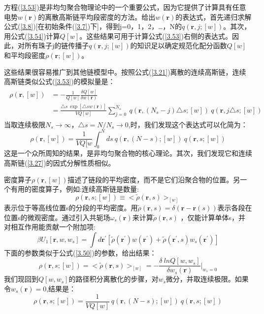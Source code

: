 方程(\ref{3.53})是非均匀聚合物理论中的一个重要公式，因为它提供了计算具有任意电势$w(\mathbf{r})$的离散高斯链平均段密度的方法。给出$w(\mathbf{r})$的表达式，首先递归求解公式(\ref{3.8})[在初始条件(\ref{3.7})下]，得到j=0，1，2，…，N的$q(\mathbf{r},j;[w])$。其次，用公式(\ref{3.54})计算$Q[w]$。这些结果可用于计算公式(\ref{3.53})右侧的表达式。因此，对所有珠子j的链传播子$q(\mathbf{r},j;[w])$的知识足以确定规范化配分函数$Q[w]$和平均段密度$\rho(\mathbf{r};[w])$。

这些结果很容易推广到其他链模型中。按照公式(\ref{3.21})离散的连续高斯链，连续高斯链类似公式(\ref{3.53})的模拟量是：
\begin{align}\label{3.54}
\begin{split}
\rho(\mathbf{r},[w])&=-\frac{1}{Q[w]}\frac{\delta Q[w]}{\delta w(\mathbf{r})}\\ &=\frac{\triangle s ~\exp[\triangle sw(\mathbf{r})]}{VQ[w]}\sum_{j=0}^{N_s}~q(\mathbf{r},(N_s-j)\triangle s;[w])~q(\mathbf{r},j\triangle s;[w])
\end{split}
\end{align}
当取连续极限$N_s\to \infty$，$\triangle s=N/N_s\to 0$,时，我们发现这个表达式可以化简为：
\begin{equation}\label{3.55}
\rho(\mathbf{r},[w])=\frac{1}{VQ[w}\int_{0}^{N}ds~q(\mathbf{r},(N-s);[w])~q(\mathbf{r},s;[w])
\end{equation}
这是一个众所周知的结果，是非均匀聚合物的核心理论。其次，我们发现它和连续高斯链(\ref{3.27})的因式分解性质相似。

密度算子$\rho(\mathbf{r},[w])$描述了链段的平均密度，而不是它们沿聚合物的位置。另一个有用的密度算子，例如:连续高斯链是数量:
\begin{equation}\label{3.56}
\rho(\mathbf{r},s;[w])\equiv <\tilde{\rho}(\mathbf{r},s)>_{[w]}
\end{equation}
表示位于等高线位置s的分段的平均密度。用$\tilde{\rho}(\mathbf{r},s)=\delta(\mathbf{r}-\mathbf{r}(s))$表示各段在位置s的微观密度。通过引入共轭场$\omega_s(\mathbf{r})$来计算$\tilde{\rho}(\mathbf{r},s)$
，仅能计算单体s，并对相互作用能贡献一个附加项:
\begin{equation}\label{3.57}
\beta U_1[\mathbf{r},w ,w_s]=\int d\mathbf{r}^{'}[\tilde{\rho}(\mathbf{r}^{'})w (\mathbf{r}^{'})+\tilde{\rho}(\mathbf{r}^{'},s)w_s(\mathbf{r}^{'})]
\end{equation}
下面的参数类似于公式(\ref{3.50})的参数，给出结果：
\begin{equation}\label{3.58}
\rho(\mathbf{r},s;[w])=<\tilde{\rho}(\mathbf{r},s)>_{[w]}
=-\frac{\delta~lnQ[w,w_s]}{\delta w_s(\mathbf{r})} \bigg |_{w_s=0}
\end{equation}
我们现回到$Q[w,w_s]$的路径积分离散化的步骤，对$w_s$微分，并取连续极限。如果令$w_s(\mathbf{r})=0$,结果是：
\begin{equation}\label{3.59}
\rho(\mathbf{r},s;[w])=\frac{1}{VQ[w]}~q(\mathbf{r},(N-s);[w])~q(\mathbf{r},s;[w])
\end{equation}

